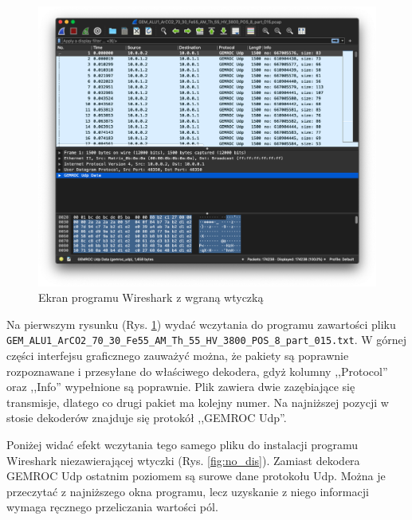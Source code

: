 \documentclass[a4paper, 12pt, twoside, openright]{article}
\begin{document}
	\begin{figure}[h]
		\centering
			\includegraphics[width=1.0\textwidth]{img/screenshot_dissector.png}
		\caption{Ekran programu Wireshark z wgraną wtyczką}
		\label{fig:dis}
	\end{figure}

Na pierwszym rysunku (Rys. \ref{fig:dis}) wydać wczytania do programu zawartości pliku
\texttt{GEM\_ALU1\_ArCO2\_70\_30\_Fe55\_AM\_Th\_55\_HV\_3800\_POS\_8\_part\_015.txt}.
W górnej części interfejsu graficznego zauważyć można, że pakiety są poprawnie rozpoznawane i przesyłane do właściwego dekodera, gdyż
kolumny ,,Protocol'' oraz ,,Info'' wypełnione są poprawnie. Plik zawiera dwie zazębiające się transmisje, dlatego co drugi pakiet ma kolejny numer.
Na najniższej pozycji w stosie dekoderów znajduje się protokół ,,GEMROC Udp''.

Poniżej widać efekt wczytania tego samego pliku do instalacji programu Wireshark niezawierającej wtyczki (Rys. \ref{fig:no_dis}).
Zamiast dekodera GEMROC Udp ostatnim poziomem są surowe dane protokołu Udp. Można je przeczytać z najniższego okna programu,
lecz uzyskanie z niego informacji wymaga ręcznego przeliczania wartości pól.
\end{document}
